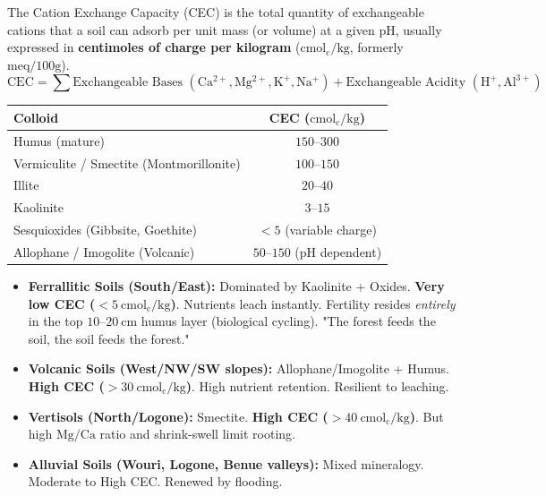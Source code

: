 \documentclass[11pt]{article}
\newcommand{\cle}[1]{{\popxbold\color{popdark}#1}}
\begin{document}
\begin{definition}
The \cle{Cation Exchange Capacity (CEC)} is the total quantity of exchangeable cations that a soil can adsorb per unit mass (or volume) at a given pH, usually expressed in \textbf{centimoles of charge per kilogram} ($\mathrm{cmol_c/kg}$, formerly $\mathrm{meq/100g}$).
\[
\mathrm{CEC} = \sum \text{Exchangeable Bases } (\mathrm{Ca^{2+}, Mg^{2+}, K^+, Na^+}) + \text{Exchangeable Acidity } (\mathrm{H^+, Al^{3+}})
\]
\end{definition}

\begin{propriete}
\begin{center}
\begin{tabular}{|l|c|}\hline
\rowcolor{popblueL}
\textbf{Colloid} & \textbf{CEC ($\mathrm{cmol_c/kg}$)} \\ \hline
Humus (mature) & $150\text{--}300$ \\ \hline
Vermiculite / Smectite (Montmorillonite) & $100\text{--}150$ \\ \hline
Illite & $20\text{--}40$ \\ \hline
Kaolinite & $3\text{--}15$ \\ \hline
Sesquioxides (Gibbsite, Goethite) & $< 5$ (variable charge) \\ \hline
Allophane / Imogolite (Volcanic) & $50\text{--}150$ (pH dependent) \\ \hline
\end{tabular}
\end{center}
\end{propriete}

\begin{aretenir}
\begin{itemize}
    \item \textbf{Ferrallitic Soils (South/East):} Dominated by Kaolinite + Oxides. \textbf{Very low CEC ($< 5\ \mathrm{cmol_c/kg}$)}. Nutrients leach instantly. Fertility resides \emph{entirely} in the top $10\text{--}20\ \mathrm{cm}$ humus layer (biological cycling). "The forest feeds the soil, the soil feeds the forest."
    \item \textbf{Volcanic Soils (West/NW/SW slopes):} Allophane/Imogolite + Humus. \textbf{High CEC ($> 30\ \mathrm{cmol_c/kg}$)}. High nutrient retention. Resilient to leaching.
    \item \textbf{Vertisols (North/Logone):} Smectite. \textbf{High CEC ($> 40\ \mathrm{cmol_c/kg}$)}. But high $\mathrm{Mg/Ca}$ ratio and shrink-swell limit rooting.
    \item \textbf{Alluvial Soils (Wouri, Logone, Benue valleys):} Mixed mineralogy. Moderate to High CEC. Renewed by flooding.
\end{itemize}
\end{aretenir}
\end{document}

